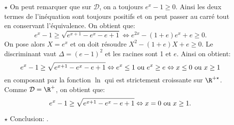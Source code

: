 \begin{correction}
\begin{enumerate}
\begin{itemize}
\item[$\star$] On peut remarquer que sur $\mathcal{D}$, on a toujours $e^x-1\geq 0$. Ainsi les deux termes de l'in\'equation sont toujours positifs et on peut passer au carr\'e tout en conservant l'\'equivalence. On obtient que:
$$e^x-1\geq \sqrt{e^{x+1}-e^x-e+1} \Leftrightarrow e^{2x}-(1+e)e^x+e\geq 0.$$
On pose alors $X=e^x$ et on doit r\'esoudre $X^2-(1+e)X+e\geq 0$. Le discriminant vaut $\Delta=(e-1)^2$ et les racines sont 1 et $e$. Ainsi on obtient:
$$e^x-1\geq \sqrt{e^{x+1}-e^x-e+1} \Leftrightarrow e^x\leq 1\ \hbox{ou}\ e^x\geq e\Leftrightarrow x\leq 0\ \hbox{ou}\ x\geq 1$$
en composant par la fonction $\ln{}$ qui est strictement croissante sur $\R^{+\star}$. Comme $\mathcal{D}=\R^+$, on obtient que:
$$e^x-1\geq \sqrt{e^{x+1}-e^x-e+1} \Leftrightarrow x=0\ \hbox{ou}\ x\geq 1.$$
\item[$\star$] Conclusion: .
\end{itemize}


\end{enumerate}
\end{correction}
